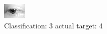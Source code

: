 \begin{figure}[h!]
\begin{center}
\includegraphics[width=0.60\columnwidth]{figures/ID2556_class_3_target_4.png}
\end{center}
\caption{ Classification: 3 actual target: 4}
\label{fig:ID2556_class_3_target_4}
\end{figure}
